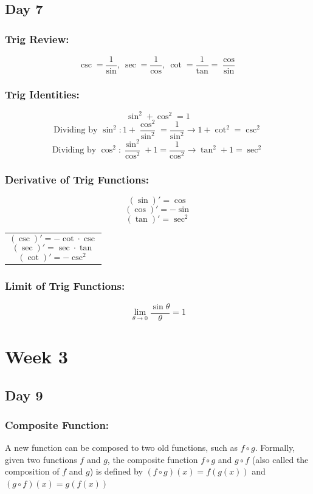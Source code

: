 \documentclass[12pt]{article}
\begin{document}
\subsection{Day 7}
\subsubsection{Trig Review:}
$$\csc = \frac{1}{\sin}, \ \sec = \frac{1}{\cos}, \ \cot = \frac{1}{\tan} = \frac{\cos}{\sin}$$
\subsubsection{Trig Identities:}
$$\sin^2 + \cos^2 = 1$$
$$\text{Dividing by }\sin^2: 1 + \frac{\cos^2}{\sin^2} = \frac{1}{\sin^2} \rightarrow{} 1 + \cot^2 = \csc^2$$
$$\text{Dividing by }\cos^2: \frac{\sin^2}{\cos^2} + 1 = \frac{1}{\cos^2} \rightarrow{} \tan^2 + 1 = \sec^2$$
\subsubsection{Derivative of Trig Functions:}
\begin{minipage}{0.5\textwidth}
    
    $$(\sin)' = \cos$$
    $$(\cos)' = -\sin$$
    $$(\tan)' = \sec^2 $$
\hfil
\end{minipage}
\begin{minipage}{0.45\textwidth}
\begin{tabular}{|p{\textwidth}}

    $$(\csc)' = -\cot \cdot \csc$$
    $$(\sec)' = \sec \cdot \tan$$
    $$(\cot)' = -\csc^2 $$

\end{tabular}
\end{minipage}

\subsubsection{Limit of Trig Functions:}

$$\lim_{\theta \to 0}{\frac{\sin \theta}{\theta}} = 1$$

\section{Week 3}
\subsection{Day 9}
\subsubsection{Composite Function: } A new function can be  composed to two old functions, such as $f \circ g$. Formally, given two functions $f$ and $g$, the composite function $f \circ g$ and $g \circ f$ (also called the composition of $f$ and $g$) is defined by $(f \circ g)(x)  = f(g(x))$ and $(g \circ f)(x)  = g(f(x))$
\end{document}
